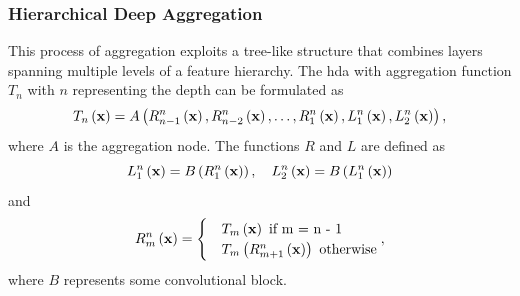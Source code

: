 \subsubsection{Hierarchical Deep Aggregation}

This process of aggregation exploits a tree-like structure that combines layers spanning multiple levels of a feature hierarchy. The \gls{hda} with aggregation function $T_n$ with $n$ representing the depth can be formulated as
\begin{equation}
    \label{eq:HierarchicalDeepAggregation}
    {T_n} \left( \mathbf{x} \right) =
    {A} \left( 
        {{R}_{n - 1}^{n}} \left( \mathbf{x} \right),
        {{R}_{n - 2}^{n}} \left( \mathbf{x} \right),
        \dots,
        {{R}_{1}^{n}} \left( \mathbf{x} \right),
        {{L}_{1}^{n}} \left( \mathbf{x} \right),
        {{L}_{2}^{n}} \left( \mathbf{x} \right)
     \right),
\end{equation}
where $A$ is the aggregation node. The functions $R$ and $L$ are defined as
\begin{equation}
    \label{eq:HDAConvBlocksL}
    {{L}_{1}^{n}} \left( \mathbf{x} \right) = {B} \left( {{R}_{1}^{n}} \left( \mathbf{x} \right) \right),
    \quad
    {{L}_{2}^{n}} \left( \mathbf{x} \right) = {B} \left( {{L}_{1}^{n}} \left( \mathbf{x} \right) \right)
\end{equation}
and
\begin{equation}
    \label{eq:DLAConvBlocksR}
    \func{\subsup{R}{m}{n}}{\vect{x}} =
    \begin{cases}
         & \func{T_m}{\vect{x}} \text{ if } $m = n - 1$                        \\
         & \func{T_m}{\func{\subsup{R}{m + 1}{n}}{\vect{x}}} \text{ otherwise}
    \end{cases},
\end{equation}
where $B$ represents some convolutional block.
